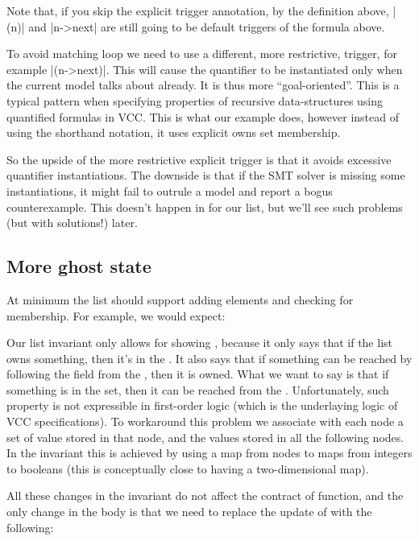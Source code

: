 Note that, if you skip the explicit trigger annotation, by the definition
above, \vcc|{\mine(n)}| and \vcc|n->next| are still going to be default
triggers of the formula above.

To avoid matching loop we need to use a different, more restrictive,
trigger, for example \vcc|{\mine(n->next)}|.
This will cause the quantifier to be instantiated only when the current
model talks about  already.
It is thus more ``goal-oriented''.
This is a typical pattern when specifying properties of recursive data-structures
using quantified formulas in VCC.
This is what our example does, however instead of using the shorthand
notation, it uses explicit owns set membership.

So the upside of the more restrictive explicit trigger is that it avoids
excessive quantifier instantiations.
The downside is that if the SMT solver is missing some instantiations,
it might fail to outrule a model and report a bogus counterexample.
This doesn't happen in for our list, but we'll see such problems
(but with solutions!) later.

\subsection{More ghost state}

At minimum the list should support adding elements and checking
for membership. For example, we would expect:


\noindent
Our list invariant only allows for showing
, because it only says
that if the list owns something, then it's in the .
It also says that if something can be reached by following
the  field from the , then it is owned.
What we want to say is that if something is in the 
set, then it can be reached from the .
Unfortunately, such property is not expressible in first-order
logic (which is the underlaying logic of VCC specifications).
To workaround this problem we associate with each node
a set of value stored in that node, and the values stored in all the following nodes.
In the invariant this is achieved by using a map from nodes
to maps from integers to booleans (this is conceptually close
to having a two-dimensional map).


\noindent
{}
All these changes in the invariant do not affect
the contract of  function, and the only change in the body
is that we need to replace the update of  with the following:

